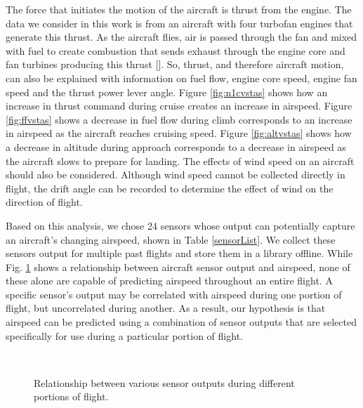 \documentclass[]{aiaa-tc}
\begin{document}
The force that initiates the motion of the aircraft is thrust from the engine. The data we consider in this work is from an aircraft with four turbofan engines that generate this thrust. As the aircraft flies, air is passed through the fan and mixed with fuel to create combustion that sends exhaust through the engine core and fan turbines producing this thrust []. So, thrust, and therefore aircraft motion, can also be explained with information on fuel flow, engine core speed, engine fan speed and the thrust power lever angle. Figure \ref{fig:n1cvstas} shows how an increase in thrust command during cruise creates an increase in airspeed. Figure \ref{fig:ffvstas} shows a decrease in fuel flow during climb corresponds to an increase in airspeed as the aircraft reaches cruising speed. Figure \ref{fig:altvstas} shows how a decrease in altitude during approach corresponds to a decrease in airspeed as the aircraft slows to prepare for landing. The effects of wind speed on an aircraft should also be considered. Although wind speed cannot be collected directly in flight, the drift angle can be recorded to determine the effect of wind on the direction of flight. 

Based on this analysis, we chose 24 sensors whose output can potentially capture an aircraft's changing airspeed, shown in Table \ref{sensorList}. We collect these sensors output for multiple past flights and store them in a library offline. While Fig. \ref{fig:n1candff} shows a relationship between aircraft sensor output and airspeed, none of these alone are capable of predicting airspeed throughout an entire flight. A specific sensor's output may be correlated with airspeed during one portion of flight, but uncorrelated during another. As a result, our hypothesis is that airspeed can be predicted using a combination of sensor outputs that are selected specifically for use during a particular portion of flight. 

\begin{figure}[h!]
    \centering
     ~\hfill
    ~\vfill
     ~\hfill
    ~\vfill
    \caption{Relationship between various sensor outputs during different portions of flight. }
    \label{fig:n1candff}
\end{figure}
\end{document}
